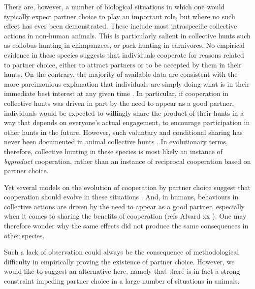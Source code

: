 There are, however, a number of biological situations in which one would typically expect partner choice to play an important role, but where no such effect has ever been demonstrated. These include most intraspecific collective actions in non-human animals. This is particularly salient in collective hunts such as collobus hunting in chimpanzees, or pack hunting in carnivores. No empirical evidence in these species suggests that individuals cooperate for reasons related to partner choice, either to attract partners or to be accepted by them in their hunts. On the contrary, the majority of available data are consistent with the more parcimonious explanation that individuals are simply doing what is in their immediate best interest at any given time \cite{Packer1986,Packer1988a, Melis2008, Melis2011}. In particular, if cooperation in collective hunts was driven in part by the need to appear as a good partner, individuals would be expected to  willingly share the product of their hunts in a way that depends on everyone's actual engagement, to encourage participation in other hunts in the future. However, such voluntary and conditional sharing has never been documented in animal collective hunts \cite{Melis2011}. In evolutionary terms, therefore, collective hunting in these species is most likely an instance of \textit{byproduct} cooperation, rather than an instance of reciprocal cooperation based on partner choice.

Yet several models on the evolution of cooperation by  partner choice suggest that cooperation should evolve in these situations \cite{McNamara2008, Aktipis2011, Barclay2011, Campenni2014}. And, in humans, behaviours in collective actions are driven by the need to appear as a good partner, especially when it comes to sharing the benefits of cooperation (refs Alvard xx \cite{Baumard2013a}). One may therefore wonder why the same effects did not produce the same consequences in other species.

Such a lack of observation could always be the consequence of methodological difficulty in empirically proving the existence of partner choice. However, we would like to suggest an alternative here, namely that there is in fact a strong constraint impeding partner choice in a large number of situations in animals.

